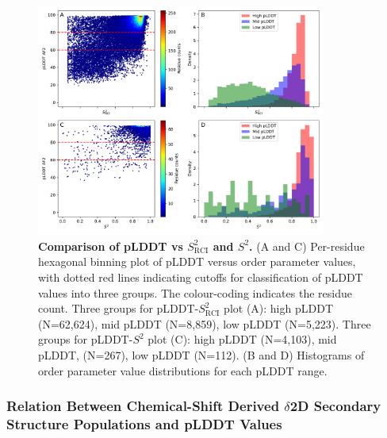 \begin{figure}[htb!]
    \centering
    \includegraphics[width=0.85\textwidth]{pLDDT/plddt_figures/rci_and_s2_vs_plddt_af2_hexbin_undivided_hist.pdf}
    \caption{\textbf{Comparison of pLDDT vs \(S^{2}_{\text{RCI}}\) and \(S^{2}\).} 
    (A and C) Per-residue hexagonal binning plot of pLDDT versus order parameter values, with dotted red lines indicating cutoffs for classification of pLDDT values into three groups. The colour-coding indicates the residue count. 
    Three groups for pLDDT-$S^2_{\text{RCI}}$ plot (A): high pLDDT (N=62,624), mid pLDDT (N=8,859), low pLDDT (N=5,223). 
    Three groups for pLDDT-$S^2$ plot (C): high pLDDT (N=4,103), mid pLDDT, (N=267), low pLDDT (N=112).
    (B and D) Histograms of order parameter value distributions for each pLDDT range.
    }
    \label{fig:plddt_vs_nmr_undivided}
\end{figure}




\subsubsection{Relation Between Chemical-Shift Derived $\delta$2D Secondary Structure Populations and pLDDT Values}

